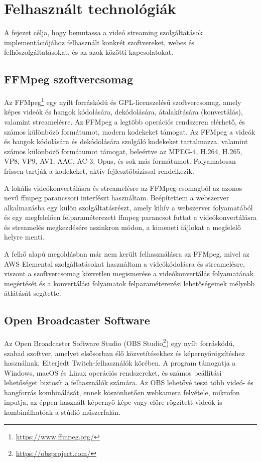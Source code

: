 \chapter{Felhasznált technológiák}

A fejezet célja, hogy bemutassa a videó streaming szolgáltatások implementációjához felhasznált konkrét szoftvereket, webes és felhőszolgáltatásokat, és az azok közötti kapcsolatokat.

\section{FFMpeg szoftvercsomag}

Az FFMpeg\footnote{\url{https://www.ffmpeg.org/}} egy nyílt forráskódú és GPL-licenszelésű szoftvercsomag, amely képes videók és hangok kódolására, dekódolására, átalakítására (konvertálás), valamint streamelésre. \cite{ffmpeg} Az FFMpeg a legtöbb operációs rendszeren elérhető, és számos különböző formátumot, modern kodekeket támogat. Az FFMpeg a videók és hangok kódolására és dekódolására szolgáló kodekeket tartalmazza, valamint számos különböző formátumot támogat, beleértve az MPEG-4, H.264, H.265, VP8, VP9, AV1, AAC, AC-3, Opus, és sok más formátumot. Folyamatosan frissen tartják a kodekeket, aktív fejlesztőbázissal rendelkezik.

A lokális videókonvertálásra és streamelésre az FFMpeg-csomagból az azonos nevű ffmpeg parancssori interfészt használtam. Beépítettem a webszerver alkalmazásba egy külön szolgáltatásrészt, amely kihív a webszerver folyamatából és egy megfelelően felparaméterezett ffmpeg parancsot futtat a videókonvertálásra és streamelés megkezdésére aszinkron módon, a kimeneti fájlokat a megfelelő helyre menti.

A felhő alapú megoldásban már nem került felhasználásra az FFMpeg, mivel az AWS Elemental szolgáltatásokat használtam a videókódolásra és streamelésre, viszont a szoftvercsomag közvetlen megismerése a videókonvertálás folyamatának megértését és a konvertálási folyamatok felparaméterezési lehetőségeinek mélyebb átlátását segítette.

\section{Open Broadcaster Software}

Az Open Broadcaster Software Studio (OBS Studio\footnote{\url{https://obsproject.com/}}) egy nyílt forráskódú, szabad szoftver, amelyet elsősorban élő közvetítésekhez és képernyőrögzítéshez használnak. Elterjedt Twitch-felhasználók körében. A program támogatja a Windows, macOS és Linux operációs rendszereket, és számos beállítási lehetőséget biztosít a felhasználók számára. Az OBS lehetővé teszi több videó- és hangforrás kombinálását, ennek köszönhetően webkamera felvétele, mikrofon inputja, az éppen használt képernyő képe vagy előre rögzített videók is kombinálhatóak a stúdió műszerfalán.

